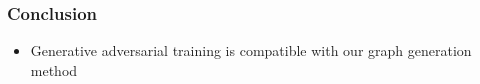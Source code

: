 \documentclass{beamer}
\newcommand{\red}[1]{\textcolor{red}{#1}}
\begin{document}
\begin{frame}
    \frametitle{Conclusion}
    
    \begin{itemize}
        \item Generative adversarial training is  compatible with our 
            graph generation method
    \end{itemize}

\end{frame}
\end{document}
